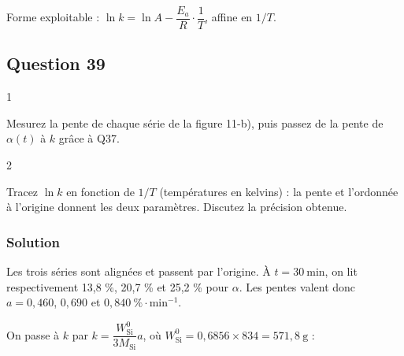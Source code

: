 \documentclass[11pt,a4paper]{article}
\begin{document}
Forme exploitable : \(\ln k=\ln A-\dfrac{E_a}{R}\cdot\dfrac1T\), affine en \(1/T\).

\hypertarget{question-39}{%
\subsection{Question 39}\label{question-39}}

\begin{indication}{1}

Mesurez la pente de chaque série de la figure 11-b), puis passez de la pente de \(\alpha(t)\) à \(k\) grâce à Q37.

\end{indication}

\begin{indication}{2}

Tracez \(\ln k\) en fonction de \(1/T\) (températures en kelvins) : la pente et l'ordonnée à l'origine donnent les deux paramètres. Discutez la précision obtenue.

\end{indication}

\hypertarget{solution-38}{%
\subsubsection{Solution}\label{solution-38}}

Les trois séries sont alignées et passent par l'origine. À \(t=30\ \mathrm{min}\), on lit respectivement 13,8 \%, 20,7 \% et 25,2 \% pour \(\alpha\). Les pentes valent donc \(a=0{,}460\), \(0{,}690\) et \(0{,}840\ \%\cdot\mathrm{min^{-1}}\).

On passe à \(k\) par \(k=\dfrac{W^0_{\mathrm{Si}}}{3M_{\mathrm{Si}}}a\), où \(W^0_{\mathrm{Si}}=0{,}6856\times834=571{,}8\ \mathrm{g}\) :
\end{document}
